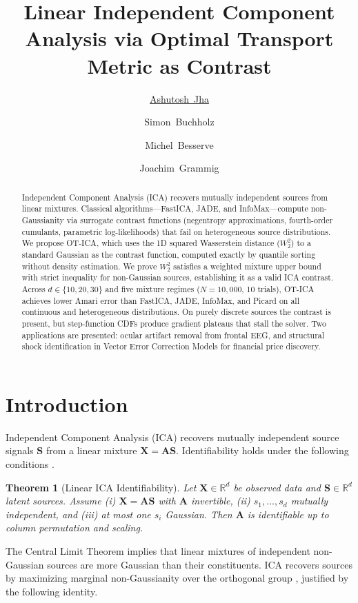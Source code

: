 \documentclass{tpm2026} %
\title{Linear Independent Component Analysis via Optimal Transport Metric as Contrast}
\author[1,2]{\href{mailto:ashutosh.jha@student.uni-tuebingen.de?Subject=TPM 2026 Paper Inquiry}{Ashutosh~Jha}}
\author[1]{Simon~Buchholz}
\author[1,3]{Michel~Besserve}
\author[2]{Joachim~Grammig}
\affil[1]{%
    Empirical Inference Group\\
    Max Planck Institute for Intelligent Systems, T\"ubingen
}
\affil[2]{%
    Chair of Statistics, Econometrics and Empirical Economics\\
    University of T\"ubingen
}
\affil[3]{%
    Institute of Artificial Intelligence\\
    TU Braunschweig
}
\newtheorem{theorem}{Theorem}
\begin{document}
\maketitle

\begin{abstract}
Independent Component Analysis (ICA) recovers mutually independent sources from linear mixtures. Classical algorithms---FastICA, JADE, and InfoMax---compute non-Gaussianity via surrogate contrast functions (negentropy approximations, fourth-order cumulants, parametric log-likelihoods) that fail on heterogeneous source distributions. We propose OT-ICA, which uses the 1D squared Wasserstein distance ($W_2^2$) to a standard Gaussian as the contrast function, computed exactly by quantile sorting without density estimation. We prove $W_2^2$ satisfies a weighted mixture upper bound with strict inequality for non-Gaussian sources, establishing it as a valid ICA contrast. Across $d \in \{10, 20, 30\}$ and five mixture regimes ($N = 10{,}000$, 10 trials), OT-ICA achieves lower Amari error than FastICA, JADE, InfoMax, and Picard on all continuous and heterogeneous distributions. On purely discrete sources the contrast is present, but step-function CDFs produce gradient plateaus that stall the solver. Two applications are presented: ocular artifact removal from frontal EEG, and structural shock identification in Vector Error Correction Models for financial price discovery.
\end{abstract}

\section{Introduction}
Independent Component Analysis (ICA) \citep{jutten1985, comon1994} recovers mutually independent source signals $\mathbf{S}$ from a linear mixture $\mathbf{X} = \mathbf{A}\mathbf{S}$. Identifiability holds under the following conditions \citep{comon1994}.

\begin{theorem}[Linear ICA Identifiability]
Let $\mathbf{X} \in \mathbb{R}^d$ be observed data and $\mathbf{S} \in \mathbb{R}^d$ latent sources. Assume (i) $\mathbf{X} = \mathbf{A}\mathbf{S}$ with $\mathbf{A}$ invertible, (ii) $s_1, \dots, s_d$ mutually independent, and (iii) at most one $s_i$ Gaussian. Then $\mathbf{A}$ is identifiable up to column permutation and scaling.
\end{theorem}

The Central Limit Theorem implies that linear mixtures of independent non-Gaussian sources are more Gaussian than their constituents. ICA recovers sources by maximizing marginal non-Gaussianity over the orthogonal group \citep{hyvarinen2001}, justified by the following identity.
\end{document}
